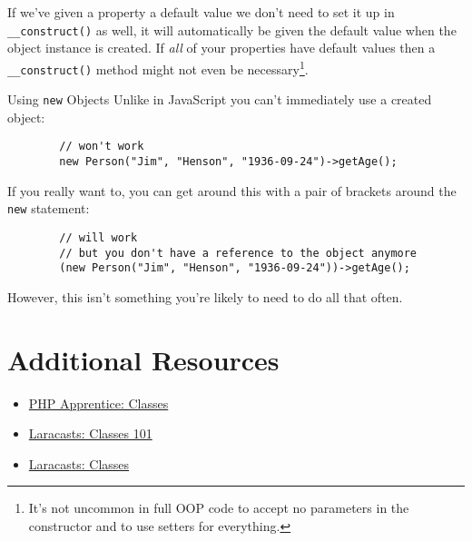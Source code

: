 If we've given a property a default value we don't need to set it up in \texttt{\_\_construct()} as well, it will automatically be given the default value when the object instance is created. If \textit{all} of your properties have default values then a \texttt{\_\_construct()} method might not even be necessary\footnote{It's not uncommon in full OOP code to accept no parameters in the constructor and to use setters for everything.}.

\pagebreak

\begin{infobox}{Using \texttt{new} Objects}
    Unlike in JavaScript you can't immediately use a created object:

    \begin{verbatim}
        // won't work
        new Person("Jim", "Henson", "1936-09-24")->getAge();
    \end{verbatim}

    If you really want to, you can get around this with a pair of brackets around the \texttt{new} statement:

    \begin{verbatim}
        // will work
        // but you don't have a reference to the object anymore
        (new Person("Jim", "Henson", "1936-09-24"))->getAge();
    \end{verbatim}

    However, this isn't something you're likely to need to do all that often.
\end{infobox}


\section{Additional Resources}

\begin{itemize}[leftmargin=*]
    \item \href{https://phpapprentice.com/classes.html}{PHP Apprentice: Classes}
    \item \href{https://laracasts.com/series/php-for-beginners/episodes/12}{Laracasts: Classes 101}
    \item \href{https://laracasts.com/series/object-oriented-bootcamp-in-php/episodes/1}{Laracasts: Classes}
\end{itemize}
